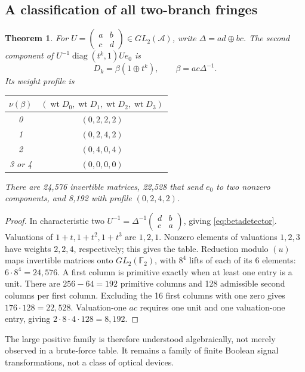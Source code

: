 \documentclass[11pt,a4paper]{article}
\newtheorem{theorem}{Theorem}[section]
\theoremstyle{definition}\newtheorem{definition}[theorem]{Definition}
\theoremstyle{remark}\newtheorem{remark}[theorem]{Remark}
\newcommand{\F}{\mathbb F}
\newcommand{\alg}{\mathcal A}
\newcommand{\wt}{\operatorname{wt}}
\newcommand{\diag}{\operatorname{diag}}
\numberwithin{equation}{section}
\begin{document}
\subsection{A classification of all two-branch fringes}
\begin{theorem}\label{thm:splitcount}
For $U=\left(\begin{smallmatrix}a&b\\c&d\end{smallmatrix}\right)\in GL_2(\alg)$, write $\Delta=ad\oplus bc$. The second component of $U^{-1}\diag(t^k,1)Ue_0$ is
\begin{equation}\label{eq:betadetector}
 D_k=\beta(1\oplus t^k),\qquad \beta=ac\Delta^{-1}.
\end{equation}
Its weight profile is
\begin{center}\begin{tabular}{@{}cc@{}}\toprule
$\nu(\beta)$ & $(\wt D_0,\wt D_1,\wt D_2,\wt D_3)$\\\midrule
0 & $(0,2,2,2)$\\
1 & $(0,2,4,2)$\\
2 & $(0,4,0,4)$\\
3 or 4 & $(0,0,0,0)$\\\bottomrule
\end{tabular}\end{center}
There are 24,576 invertible matrices, 22,528 that send $e_0$ to two nonzero components, and 8,192 with profile $(0,2,4,2)$.
\end{theorem}
\begin{proof}
In characteristic two $U^{-1}=\Delta^{-1}\left(\begin{smallmatrix}d&b\\c&a\end{smallmatrix}\right)$, giving \cref{eq:betadetector}. Valuations of $1+t,1+t^2,1+t^3$ are $1,2,1$. Nonzero elements of valuations $1,2,3$ have weights $2,2,4$, respectively; this gives the table. Reduction modulo $(u)$ maps invertible matrices onto $GL_2(\F_2)$, with $8^4$ lifts of each of its 6 elements: $6\cdot8^4=24,576$. A first column is primitive exactly when at least one entry is a unit. There are $256-64=192$ primitive columns and 128 admissible second columns per first column. Excluding the 16 first columns with one zero gives $176\cdot128=22,528$. Valuation-one $ac$ requires one unit and one valuation-one entry, giving $2\cdot8\cdot4\cdot128=8,192$.
\end{proof}
The large positive family is therefore understood algebraically, not merely observed in a brute-force table. It remains a family of finite Boolean signal transformations, not a class of optical devices.
\end{document}
